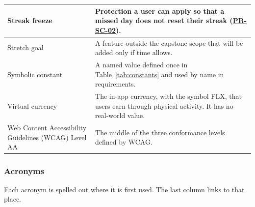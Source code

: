 \documentclass[12pt]{article}
\newcommand{\acr}[3]{\phantomsection\label{acr:#1}#2 (#3)}
\begin{document}
\begin{xltabular}{\textwidth}{|p{4cm}|X|}
\hline
Streak freeze & Protection a user can apply so that a missed day does not reset their streak (\hyperlink{req:PR-SC-02}{PR-SC-02}). \\
\hline
Stretch goal & A feature outside the capstone scope that will be added only if time allows. \\
\hline
Symbolic constant & A named value defined once in Table~\ref{tab:constants} and used by name in requirements. \\
\hline
Virtual currency & The in-app currency, with the symbol FLX, that users earn through physical activity. It has no real-world value. \\
\hline
\acr{WCAG}{Web Content Accessibility Guidelines}{WCAG} Level AA & The middle of the three conformance levels defined by WCAG. \\
\hline
\end{xltabular}
\normalsize

\subsubsection{Acronyms}

Each acronym is spelled out where it is first used. The last column links to
that place.
\end{document}
